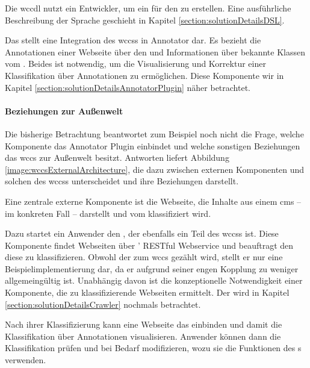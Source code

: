         Die \gls{wccdl} nutzt ein Entwickler, um ein {\classificationModel} für den
        {\classificationService} zu erstellen.
        Eine ausführliche Beschreibung der Sprache geschieht in Kapitel \ref{section:solutionDetailsDSL}.

        Das {\annotatorPlugin} stellt eine Integration des \glspl{wccs} in Annotator dar.
        Es bezieht die Annotationen einer Webseite über den {\annotationService}
        und Informationen über bekannte Klassen vom {\classificationService}.
        Beides ist notwendig, um die Visualisierung und Korrektur einer Klassifikation über Annotationen
        zu ermöglichen.
        Diese Komponente wir in Kapitel \ref{section:solutionDetailsAnnotatorPlugin} näher betrachtet.

        \paragraph*{Beziehungen zur Außenwelt}
        Die bisherige Betrachtung beantwortet zum Beispiel noch nicht die Frage,
        welche Komponente das Annotator Plugin einbindet und welche sonstigen
        Beziehungen das \gls{wccs} zur Außenwelt besitzt.
        Antworten liefert Abbildung \ref{image:wccsExternalArchitecture},
        die dazu zwischen externen Komponenten und solchen des \glspl{wccs}
        unterscheidet und ihre Beziehungen darstellt.

        Eine zentrale externe Komponente ist die Webseite,
        die Inhalte aus einem \gls{cms} -- im konkreten Fall {\wordpress} --
        darstellt und vom {\classificationService} klassifiziert wird.
        
        Dazu startet ein Anwender den {\wordpressCrawler}, der ebenfalls ein Teil des \glspl{wccs} ist.
        Diese Komponente findet Webseiten über {\wordpress}' RESTful Webservice und beauftragt den
        {\classificationService} diese zu klassifizieren.
        Obwohl der {\wordpressCrawler} zum \gls{wccs} gezählt wird,
        stellt er nur eine Beispielimplementierung dar,
        da er aufgrund seiner engen Kopplung zu {\wordpress} weniger allgemeingültig ist.
        Unabhängig davon ist die konzeptionelle Notwendigkeit einer Komponente,
        die zu klassifizierende Webseiten ermittelt.
        Der {\wordpressCrawler} wird in Kapitel \ref{section:solutionDetailsCrawler} nochmals betrachtet.

        Nach ihrer Klassifizierung kann eine Webseite das {\annotatorPlugin} einbinden
        und damit die Klassifikation über Annotationen visualisieren.
        Anwender können dann die Klassifikation prüfen und bei Bedarf modifizieren,
        wozu sie die Funktionen des {\annotatorPlugin}s verwenden.

